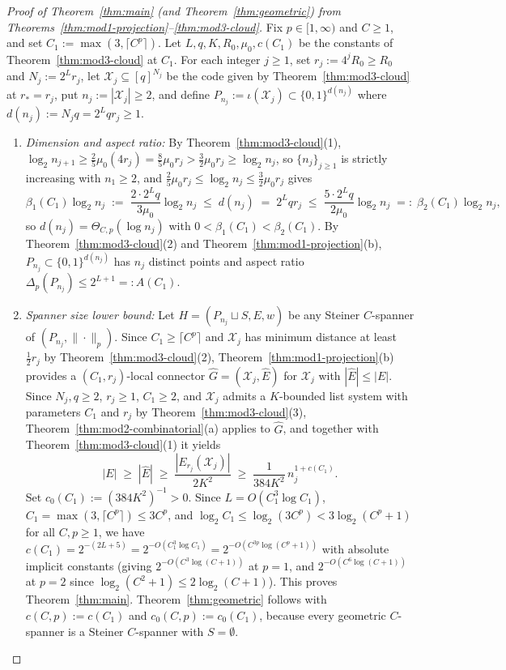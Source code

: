 \documentclass[11pt]{article}
\theoremstyle{definition}
\theoremstyle{remark}
\begin{document}
\begin{proof}[Proof of Theorem~\ref{thm:main} (and Theorem~\ref{thm:geometric}) from Theorems~\ref{thm:mod1-projection}--\ref{thm:mod3-cloud}]
Fix $p \in [1, \infty)$ and $C \ge 1$, and set $C_1 := \max(3, \lceil C^p \rceil)$. Let $L, q, K, R_0, \mu_0, c(C_1)$ be the constants of Theorem~\ref{thm:mod3-cloud} at $C_1$. For each integer $j \ge 1$, set $r_j := 4^j R_0 \ge R_0$ and $N_j := 2^L r_j$, let $\mathcal{X}_j \subseteq [q]^{N_j}$ be the code given by Theorem~\ref{thm:mod3-cloud} at $r_* = r_j$, put $n_j := |\mathcal{X}_j| \ge 2$, and define $P_{n_j} := \iota(\mathcal{X}_j) \subset \{0, 1\}^{d(n_j)}$ where $d(n_j) := N_j q = 2^L q r_j \ge 1$.
\begin{enumerate}[label=(\arabic*)]
  \item \emph{Dimension and aspect ratio:} By Theorem~\ref{thm:mod3-cloud}(1), $\log_2 n_{j+1} \ge \frac{2}{5} \mu_0 (4 r_j) = \frac{8}{5}\mu_0 r_j > \frac{3}{2} \mu_0 r_j \ge \log_2 n_j$, so $\{n_j\}_{j \ge 1}$ is strictly increasing with $n_1 \ge 2$, and $\frac{2}{5} \mu_0 r_j \le \log_2 n_j \le \frac{3}{2} \mu_0 r_j$ gives
  \[
  \beta_1(C_1)\log_2 n_j \;:=\; \frac{2 \cdot 2^L q}{3 \mu_0} \log_2 n_j \;\le\; d(n_j) \;=\; 2^L q r_j \;\le\; \frac{5 \cdot 2^L q}{2 \mu_0} \log_2 n_j \;=:\; \beta_2(C_1)\log_2 n_j,
  \]
  so $d(n_j) = \Theta_{C, p}(\log n_j)$ with $0 < \beta_1(C_1) < \beta_2(C_1)$. By Theorem~\ref{thm:mod3-cloud}(2) and Theorem~\ref{thm:mod1-projection}(b), $P_{n_j} \subset \{0, 1\}^{d(n_j)}$ has $n_j$ distinct points and aspect ratio $\Delta_p(P_{n_j}) \le 2^{L+1} =: A(C_1)$.
  \item \emph{Spanner size lower bound:} Let $H = (P_{n_j} \sqcup S, E, w)$ be any Steiner $C$-spanner of $(P_{n_j}, \|\cdot\|_p)$. Since $C_1 \ge \lceil C^p \rceil$ and $\mathcal{X}_j$ has minimum distance at least $\frac{1}{2} r_j$ by Theorem~\ref{thm:mod3-cloud}(2), Theorem~\ref{thm:mod1-projection}(b) provides a $(C_1, r_j)$-local connector $\widehat{G} = (\mathcal{X}_j, \widehat{E})$ for $\mathcal{X}_j$ with $|\widehat{E}| \le |E|$. Since $N_j, q \ge 2$, $r_j \ge 1$, $C_1 \ge 2$, and $\mathcal{X}_j$ admits a $K$-bounded list system with parameters $C_1$ and $r_j$ by Theorem~\ref{thm:mod3-cloud}(3), Theorem~\ref{thm:mod2-combinatorial}(a) applies to $\widehat{G}$, and together with Theorem~\ref{thm:mod3-cloud}(1) it yields
  \[
  |E| \;\ge\; |\widehat{E}| \;\ge\; \frac{|E_{r_j}(\mathcal{X}_j)|}{2 K^2} \;\ge\; \frac{1}{384 K^2}\,n_j^{1 + c(C_1)}.
  \]
  Set $c_0(C_1) := (384 K^2)^{-1} > 0$. Since $L = O(C_1^3 \log C_1)$, $C_1 = \max(3, \lceil C^p \rceil) \le 3 C^p$, and $\log_2 C_1 \le \log_2(3 C^p) < 3\log_2(C^p + 1)$ for all $C, p \ge 1$, we have $c(C_1) = 2^{-(2L + 5)} = 2^{-O(C_1^3 \log C_1)} = 2^{-O(C^{3p}\log(C^p + 1))}$ with absolute implicit constants (giving $2^{-O(C^3 \log(C + 1))}$ at $p = 1$, and $2^{-O(C^6 \log(C + 1))}$ at $p = 2$ since $\log_2(C^2 + 1) \le 2\log_2(C + 1)$). This proves Theorem~\ref{thm:main}. Theorem~\ref{thm:geometric} follows with $c(C, p) := c(C_1)$ and $c_0(C, p) := c_0(C_1)$, because every geometric $C$-spanner is a Steiner $C$-spanner with $S = \emptyset$. \qedhere
\end{enumerate}
\end{proof}
\end{document}
